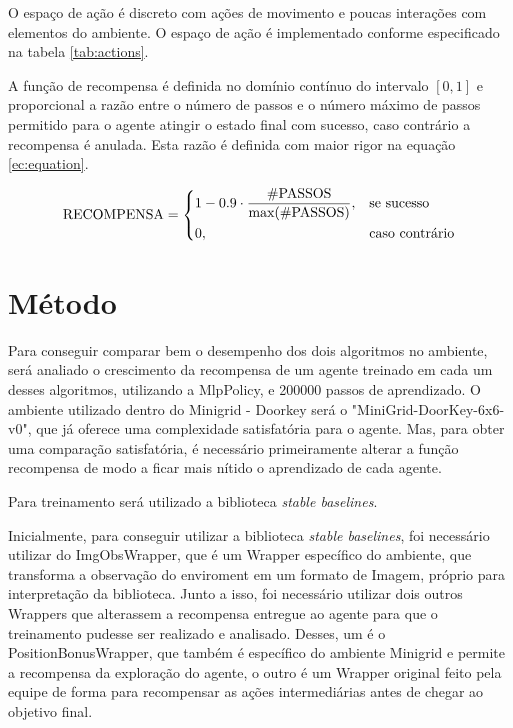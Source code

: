 \documentclass[9pt,a4paper,twoside]{tau}
\begin{document}
O espaço de ação é discreto com ações de movimento e poucas interações com elementos do ambiente. O espaço de ação é implementado conforme especificado na tabela \ref{tab:actions}.

A função de recompensa é definida no domínio contínuo do intervalo \([0, 1]\) e proporcional a razão entre o número de passos e o número máximo de passos permitido para o agente atingir o estado final com sucesso, caso contrário a recompensa é anulada. Esta razão é definida com maior rigor na equação \ref{ec:equation}.

\begin{equation}
    \label{ec:equation}
    \text{RECOMPENSA} =
    \begin{dcases}
        1-0.9\cdot\frac{\text{\#PASSOS}}{\text{max(\#PASSOS)}}, & \text{se sucesso}     \\
        0,                                                      & \text{caso contrário}
    \end{dcases}
\end{equation}


\section{Método}


Para conseguir comparar bem o desempenho dos dois algoritmos no ambiente, será analiado o crescimento da recompensa de um agente treinado em cada um desses algoritmos, utilizando a MlpPolicy, e 200000 passos de aprendizado. O ambiente utilizado dentro do Minigrid - Doorkey será o "MiniGrid-DoorKey-6x6-v0", que já oferece uma complexidade satisfatória para o agente. Mas, para obter uma comparação satisfatória, é necessário primeiramente alterar a função recompensa de modo a ficar mais nítido o aprendizado de cada agente.

\begin{info}[frametitle=Atenção]
    Para treinamento será utilizado a biblioteca \textit{stable baselines}.
\end{info}

Inicialmente, para conseguir utilizar a biblioteca \textit{stable baselines}, foi necessário utilizar do ImgObsWrapper, que é um Wrapper específico do ambiente, que transforma a observação do enviroment em um formato de Imagem, próprio para interpretação da biblioteca. Junto a isso, foi necessário utilizar dois outros Wrappers que alterassem a recompensa entregue ao agente para que o treinamento pudesse ser realizado e analisado. Desses, um é o PositionBonusWrapper, que também é específico do ambiente Minigrid e permite a recompensa da exploração do agente, o outro é um Wrapper original feito pela equipe de forma para recompensar as ações intermediárias antes de chegar ao objetivo final.
\end{document}
